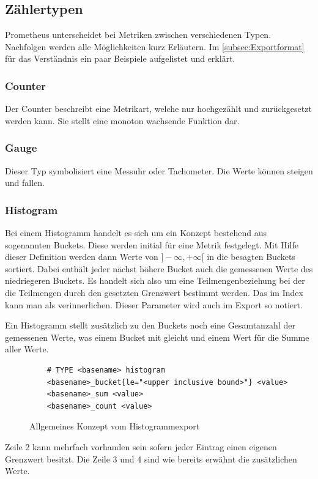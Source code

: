 \subsection{Zählertypen}
Prometheus unterscheidet bei Metriken zwischen verschiedenen Typen. Nachfolgen werden alle Möglichkeiten kurz Erläutern. Im \autoref{subsec:Exportformat}  für das Verständnis ein paar Beispiele aufgelistet und erklärt.
\subsubsection{Counter}
Der Counter beschreibt eine Metrikart, welche nur hochgezählt und zurückgesetzt werden kann. Sie stellt eine monoton wachsende Funktion dar. 
\subsubsection{Gauge}
Dieser Typ symbolisiert eine Messuhr oder Tachometer. Die Werte können steigen und fallen.
\subsubsection{Histogram}
Bei einem Histogramm handelt es sich um ein Konzept bestehend aus sogenannten Buckets. Diese werden initial für eine Metrik festgelegt. Mit Hilfe dieser Definition werden dann Werte von $]-\infty,+\infty[$  in die besagten Buckets sortiert. Dabei enthält jeder nächst höhere Bucket auch die gemessenen Werte des niedriegeren Buckets. Es handelt sich also um eine Teilmengenbeziehung bei der die Teilmengen durch den gesetzten Grenzwert bestimmt werden. Das  im Index kann man als  verinnerlichen. Dieser Parameter wird auch im Export so notiert. 
\begin{center}
\end{center}
Ein Histogramm stellt zusätzlich zu den Buckets noch eine Gesamtanzahl der gemessenen Werte, was einem Bucket mit  gleicht und einem Wert für die Summe aller Werte.
\begin{figure}[hbt!]
	\begin{verbatim}
	# TYPE <basename> histogram
	<basename>_bucket{le="<upper inclusive bound>"} <value>
	<basename>_sum <value>
	<basename>_count <value>
	\end{verbatim}
	\caption{Allgemeines Konzept vom Histogrammexport}
\end{figure}
Zeile 2 kann mehrfach vorhanden sein sofern jeder Eintrag einen eigenen Grenzwert besitzt. Die Zeile 3 und 4 sind wie bereits erwähnt die zusätzlichen Werte.
